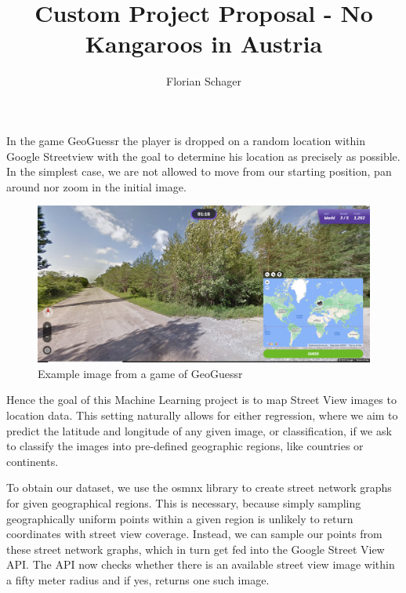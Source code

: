 \documentclass{article}
\title{Custom Project Proposal - No Kangaroos in Austria}
\author{Florian Schager}
\begin{document}
\newenvironment{Figure}
  {\par\medskip\noindent\minipage{\linewidth}}
  {\endminipage\par\medskip}


\maketitle

In the game GeoGuessr the player is dropped on a random location within Google Streetview
with the goal to determine his location as precisely as possible.
In the simplest case, we are not allowed to move from our starting position,
pan around nor zoom in the initial image.

\begin{figure}[hbt!]
  \centering
    \includegraphics[width = 0.7\linewidth]{example.PNG}
    \caption{Example image from a game of GeoGuessr}
\end{figure}

Hence the goal of this Machine Learning project is to map Street View images to location data.
This setting naturally allows for either regression, where we aim to predict the latitude and longitude of any given image,
or classification, if we ask to classify the images into pre-defined geographic regions, like countries or continents.

To obtain our dataset, we use the osmnx library to create street network graphs for given geographical regions.
This is necessary, because simply sampling geographically uniform points
within a given region is unlikely to return coordinates with street view coverage.
Instead, we can sample our points from these street network graphs, 
which in turn get fed into the Google Street View API.
The API now checks whether there is an available street view image within a fifty meter radius
and if yes, returns one such image.
\end{document}
